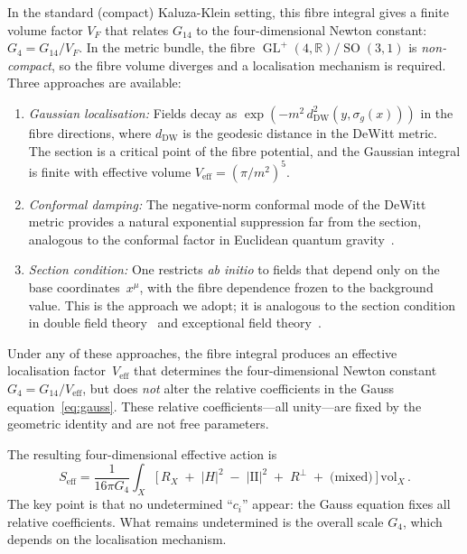 \documentclass[12pt,a4paper]{article}
\theoremstyle{definition}
\newcommand{\GL}{\operatorname{GL}}
\newcommand{\SO}{\operatorname{SO}}
\newcommand{\R}{\mathbb{R}}
\begin{document}
In the standard (compact) Kaluza-Klein setting, this fibre integral gives a finite volume factor $V_F$ that relates $G_{14}$ to the four-dimensional Newton constant: $G_4 = G_{14}/V_F$.
In the metric bundle, the fibre $\GL^+(4,\R)/\SO(3,1)$ is \emph{non-compact}, so the fibre volume diverges and a localisation mechanism is required.
Three approaches are available:

\begin{enumerate}[nosep, label=(\alph*)]
\item \emph{Gaussian localisation:} Fields decay as $\exp(-m^2\, d^2_{\mathrm{DW}}(y, \sigma_g(x)))$ in the fibre directions, where $d_{\mathrm{DW}}$ is the geodesic distance in the DeWitt metric.
The section is a critical point of the fibre potential, and the Gaussian integral is finite with effective volume $V_{\mathrm{eff}} = (\pi/m^2)^{5}$.

\item \emph{Conformal damping:} The negative-norm conformal mode of the DeWitt metric provides a natural exponential suppression far from the section, analogous to the conformal factor in Euclidean quantum gravity~\cite{Giulini2009}.

\item \emph{Section condition:} One restricts \emph{ab initio} to fields that depend only on the base coordinates~$x^\mu$, with the fibre dependence frozen to the background value.
This is the approach we adopt; it is analogous to the section condition in double field theory~\cite{HullZwiebach2009} and exceptional field theory~\cite{HohmSamtleben2013}.
\end{enumerate}

Under any of these approaches, the fibre integral produces an effective localisation factor~$V_{\mathrm{eff}}$ that determines the four-dimensional Newton constant $G_4 = G_{14}/V_{\mathrm{eff}}$, but does \emph{not} alter the relative coefficients in the Gauss equation~\eqref{eq:gauss}.
These relative coefficients---all unity---are fixed by the geometric identity and are not free parameters.

The resulting four-dimensional effective action is
\begin{equation}
\label{eq:action}
S_{\text{eff}} = \frac{1}{16\pi G_4} \int_X \Big[\, R_X \;+\; |H|^2 \;-\; |\mathrm{I\!I}|^2 \;+\; R^\perp \;+\; \text{(mixed)} \,\Big]\, \mathrm{vol}_X\,.
\end{equation}
The key point is that no undetermined ``$c_i$'' appear: the Gauss equation fixes all relative coefficients.
What remains undetermined is the overall scale $G_4$, which depends on the localisation mechanism.
\end{document}
